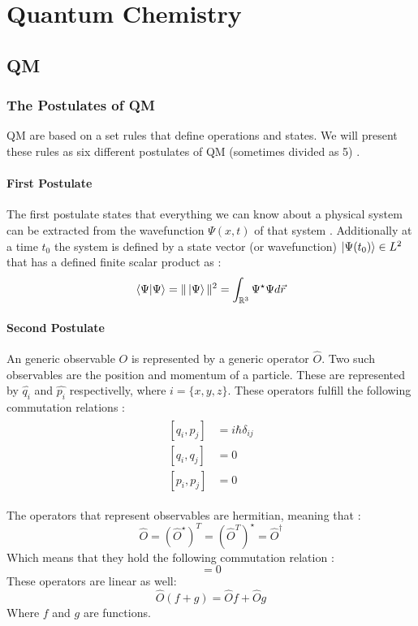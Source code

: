 \documentclass[../master_thesis.tex]{subfiles}
\begin{document}
\chapter{Quantum Chemistry}
\section{\ac{QM}}

\subsection{The Postulates of \ac{QM}}

\ac{QM} are based on a set rules that define operations and states. We will
present these rules as six different postulates of \ac{QM} (sometimes divided
as 5) \cite{Atkins:2011, Cohen:1973}.

\subsubsection{First Postulate}
The first postulate states that everything we can know about a physical system
can be extracted from the wavefunction $\Psi(x, t)$ of that system
\cite{Atkins:2011}. Additionally at a time $t_0$ the system is defined by
a state vector (or wavefunction) $\ket{\Psi(t_0)}\in L^2$ that has a defined
finite scalar product as \cite{Cohen:1973}:
\begin{equation}
  \braket{\Psi|\Psi} = \|\ket{\Psi}\|^2 =  \int_{\mathbb{R}^3}\Psi^\star\Psi d\vec{r}
\end{equation}

\subsubsection{Second Postulate}
An generic observable $O$ is represented by a generic operator $\hat{O}$. Two
such observables are the position and momentum of a particle. These are
represented by $\hat{q_i}$ and $\hat{p_i}$ respectivelly, where
$i = \{x, y, z\}$. These operators fulfill the following commutation relations
\cite{Atkins:2011, Cohen:1973}:
\begin{align}
  \begin{split}
    [q_i, p_j] &= i \hbar \delta_{ij}\\
    [q_i, q_j] &= 0 \\
    [p_i, p_j] &= 0
  \end{split}
\end{align}

The operators that represent observables are hermitian, meaning that
\cite{Cohen:1973}:
\begin{equation}
  \hat{O} = (\hat{O}^{\star})^T = (\hat{O}^T)^{\star} = \hat{O}^{\dagger}
\end{equation}
Which means that they hold the following commutation relation
\cite{Cohen:1973}:
\begin{equation}
  [\hat{O}, \hat{O}^{\dagger}] = 0
\end{equation}
These operators are linear as well:
\begin{equation}
    \hat{O}(f + g) = \hat{O}f + \hat{O}g\label{eq:oplinearity}
\end{equation}
Where $f$ and $g$ are functions.
\end{document}
